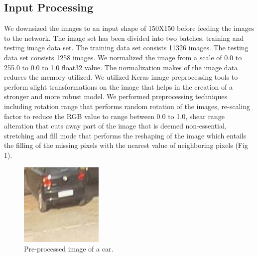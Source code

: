 \documentclass[conference]{IEEEtran}
\begin{document}
\subsection{Input Processing}
We downsized the images to an input shape of 150X150 before feeding the images to the network. The image set has been divided into two batches, training and testing image data set. The training data set consists 11326 images. The testing data set consists 1258 images. We normalized the image from a scale of 0.0 to 255.0 to 0.0 to 1.0 float32 value. The normalization makes of the image data reduces the memory utilized. We utilized Keras image preprocessing tools to perform slight transformations on the image that helps in the creation of a stronger and more robust model. We performed preprocessing techniques including rotation range that performs
random rotation of the images, re-scaling factor to reduce the RGB value to range between 0.0 to 1.0, shear range alteration that cuts away part of the image that is deemed non-essential, stretching and fill mode that performs the reshaping of the image which entails the filling of the missing pixels with the nearest value of neighboring pixels (Fig 1). 
\begin{figure}[htbp]
\centerline{\includegraphics[width=\linewidth]{./random_car_transform.jpg}}
\caption{Pre-processed image of a car.}
\label{fig}
\end{figure}
\end{document}
